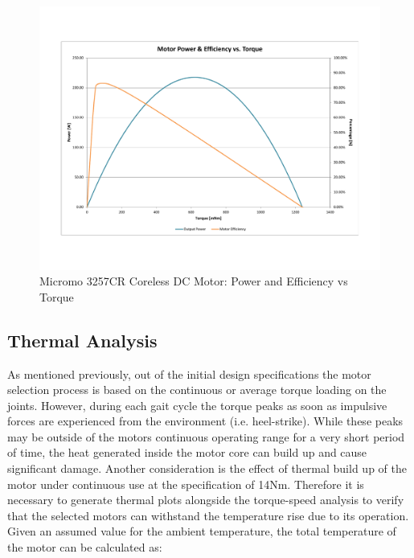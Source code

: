 \begin{figure}[!ht]
	\begin{center}
    \includegraphics[scale=0.6]{fig/ch5/motor2.pdf}
	\end{center}
  \caption{Micromo 3257CR Coreless DC Motor: Power and Efficiency vs Torque}
\end{figure}


\subsection{Thermal Analysis} %
\label{sub:thermal_analysis}
As mentioned previously, out of the initial design specifications the motor selection process is based on the continuous or average torque loading on the joints. However, during each gait cycle the torque peaks as soon as impulsive forces are experienced from the environment (i.e. heel-strike). While these peaks may be outside of the motors continuous operating range for a very short period of time, the heat generated inside the motor core can build up and cause significant damage. Another consideration is the effect of thermal build up of the motor under continuous use at the specification of 14Nm. Therefore it is necessary to generate thermal plots alongside the torque-speed analysis to verify that the selected motors can withstand the temperature rise due to its operation. Given an assumed value for the ambient temperature, the total temperature of the motor can be calculated as: 

